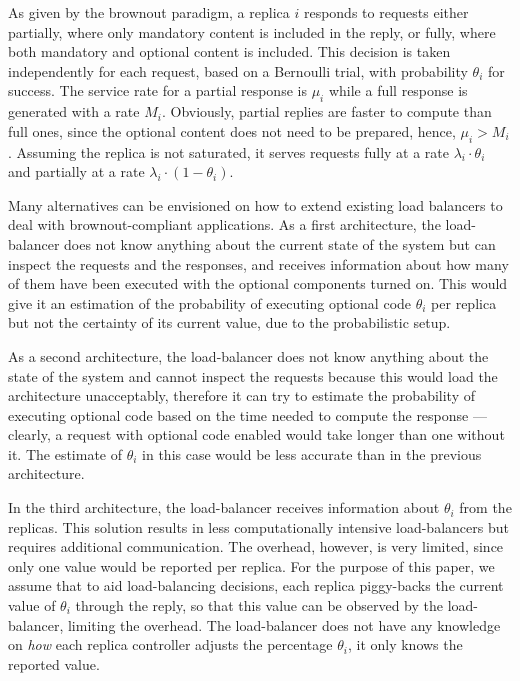 As given by the brownout paradigm, a replica $i$ responds to requests either partially, where
only mandatory content is included in the reply, or fully, where both
mandatory and optional content is included. This decision is taken independently for
each request, based on a Bernoulli trial, with probability $\theta_i$ for success.
The service rate for a
partial response is $\mu_i$ while a full response is generated with a
rate $M_i$. Obviously, partial replies are faster to compute than full
ones, since the optional content does not need to be prepared, hence,
$\mu_i > M_i$. Assuming the replica is not saturated, it serves
requests fully at a rate $\lambda_i \cdot \theta_i$ and partially at a
rate $\lambda_i \cdot (1-\theta_i)$.

Many alternatives can be envisioned on how to extend existing load
balancers to deal with brownout-compliant applications. As a first architecture,
the load-balancer does not know anything about the current state
of the system but can inspect the requests and the responses, and
receives information about how many of them have been executed with
the optional components turned on. This would give it an estimation of
the probability of executing optional code $\theta_i$ per replica but
not the certainty of its current value, due to the probabilistic
setup.

As a second architecture, the load-balancer does not know anything about the
state of the system and cannot inspect the requests because this would
load the architecture unacceptably, therefore it can try to estimate
the probability of executing optional code based on the time needed to
compute the response --- clearly, a request with optional code enabled
would take longer than one without it. The estimate of $\theta_i$ in
this case would be less accurate than in the previous architecture.

In the third architecture, the load-balancer receives information about
$\theta_i$ from the replicas. This solution results in less
computationally intensive load-balancers but requires additional
communication. The overhead, however, is very limited, since only one
value would be reported per replica. For the purpose of this paper, we
assume that to aid load-balancing decisions, each replica piggy-backs
the current value of $\theta_i$ through the reply, so that this value
can be observed by the load-balancer, limiting the overhead. The
load-balancer does not have any knowledge on \emph{how} each replica
controller adjusts the percentage $\theta_i$, it only knows the
reported value.

